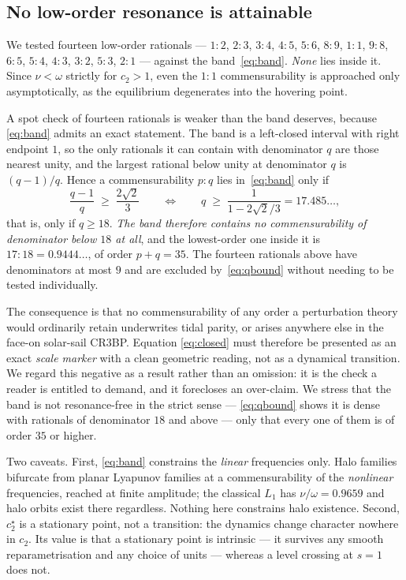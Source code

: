 \documentclass[11pt,a4paper]{article}
\begin{document}
\subsection{No low-order resonance is attainable}

We tested fourteen low-order rationals --- $1{:}2$, $2{:}3$, $3{:}4$, $4{:}5$,
$5{:}6$, $8{:}9$, $1{:}1$, $9{:}8$, $6{:}5$, $5{:}4$, $4{:}3$, $3{:}2$,
$5{:}3$, $2{:}1$ --- against the band~\eqref{eq:band}. \emph{None} lies inside
it. Since $\nu<\omega$ strictly for $c_2>1$, even the $1{:}1$ commensurability is
approached only asymptotically, as the equilibrium degenerates into the hovering
point.

A spot check of fourteen rationals is weaker than the band deserves, because
\eqref{eq:band} admits an exact statement. The band is a left-closed interval
with right endpoint $1$, so the only rationals it can contain with denominator
$q$ are those nearest unity, and the largest rational below unity at
denominator $q$ is $(q-1)/q$. Hence a commensurability $p{:}q$ lies
in~\eqref{eq:band} only if
\begin{equation}
  \frac{q-1}{q} \;\geq\; \frac{2\sqrt2}{3}
  \qquad\Longleftrightarrow\qquad
  q \;\geq\; \frac{1}{1-2\sqrt2/3} = 17.485\ldots ,
  \label{eq:qbound}
\end{equation}
that is, only if $q\geq18$. \emph{The band therefore contains no commensurability
of denominator below $18$ at all}, and the lowest-order one inside it is
$17{:}18=0.9444\ldots$, of order $p+q=35$. The fourteen rationals above have
denominators at most $9$ and are excluded by~\eqref{eq:qbound} without needing
to be tested individually.

The consequence is that no commensurability of any order a perturbation theory
would ordinarily retain underwrites tidal parity, or arises anywhere else in the
face-on solar-sail CR3BP. Equation
\eqref{eq:closed} must therefore be presented as an exact \emph{scale marker}
with a clean geometric reading, not as a dynamical transition. We regard this
negative as a result rather than an omission: it is the check a reader is
entitled to demand, and it forecloses an over-claim. We stress that the band is
not resonance-free in the strict sense --- \eqref{eq:qbound} shows it is dense
with rationals of denominator $18$ and above --- only that every one of them is
of order $35$ or higher.

Two caveats. First, \eqref{eq:band} constrains the \emph{linear} frequencies
only. Halo families bifurcate from planar Lyapunov families at a
commensurability of the \emph{nonlinear} frequencies, reached at finite
amplitude; the classical $L_1$ has $\nu/\omega=0.9659$ and halo orbits exist
there regardless. Nothing here constrains halo existence.
Second, $c_2^\star$ is a stationary point, not a transition: the dynamics change
character nowhere in $c_2$. Its value is that a stationary point is intrinsic ---
it survives any smooth reparametrisation and any choice of units --- whereas a
level crossing at $s=1$ does not.
\end{document}
